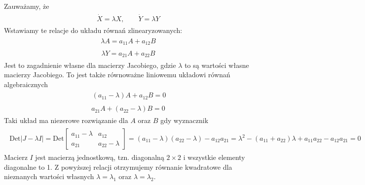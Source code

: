 \documentclass[a4paper,12pt,polish]{sphinxmanual}
\begin{document}
Zauważamy, że
\label{ch1/chI023:equation-eqn35}\begin{gather}
\begin{split} \dot X = \lambda X, \quad \quad \dot Y = \lambda  Y\end{split}\label{ch1/chI023-eqn35}
\end{gather}
Wstawiamy te relacje do  układu równań zlinearyzowanych:
\label{ch1/chI023:equation-eqn36}\begin{gather}
\begin{split}\lambda A = a_{11} A +  a_{12} B\end{split}\label{ch1/chI023-eqn36}
\end{gather}\label{ch1/chI023:equation-eqn37}\begin{gather}
\begin{split} \lambda  Y=  a_{21} A +  a_{22} B\end{split}\label{ch1/chI023-eqn37}
\end{gather}
Jest to zagadnienie własne dla macierzy Jacobiego, gdzie $\lambda$ to są wartości własne macierzy Jacobiego. To   jest także  równoważne liniowemu układowi równań algebraicznych
\label{ch1/chI023:equation-eqn38}\begin{gather}
\begin{split}\ (a_{11} - \lambda) A +  a_{12} B  = 0\end{split}\label{ch1/chI023-eqn38}
\end{gather}\label{ch1/chI023:equation-eqn39}\begin{gather}
\begin{split}a_{21} A +  (a_{22} -\lambda) B  = 0\end{split}\label{ch1/chI023-eqn39}
\end{gather}
Taki układ ma niezerowe rozwiązanie dla $A$ oraz $B$ gdy wyznacznik
\label{ch1/chI023:equation-eqn40}\begin{gather}
\begin{split}\mbox{Det}  |J-\lambda I| = \mbox{Det} \begin{bmatrix}a_{11} -\lambda &  a_{12} \\ a_{21}& a_{22} - \lambda  \end{bmatrix} = (a_{11} -\lambda) ( a_{22} -\lambda) -a_{12} a_{21} = \lambda^2  - (a_{11} +a_{22} ) \lambda +a_{11} a_{22} -a_{12} a_{21} = 0\end{split}\label{ch1/chI023-eqn40}
\end{gather}
Macierz $I$ jest macierzą jednostkową, tzn. diagonalną $2\times 2$ i wszystkie elementy diagonalne to 1. Z powyższej relacji  otrzymujemy równanie kwadratowe dla nieznanych wartości  własnych $\lambda = \lambda_1$  oraz $\lambda = \lambda_2$.
\end{document}
